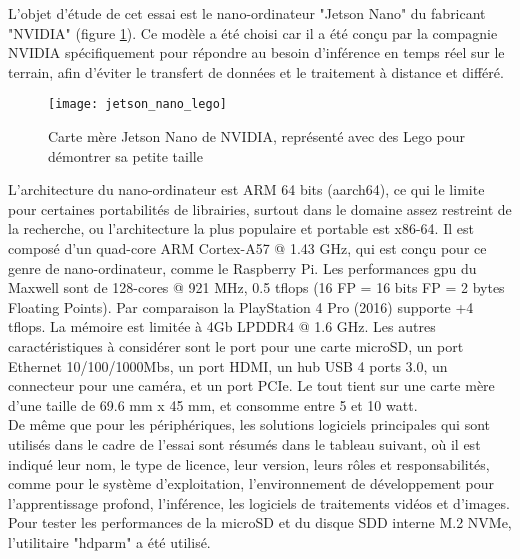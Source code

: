 ﻿
\noindent L'objet d'étude de cet essai est le nano-ordinateur "Jetson Nano" du fabricant "NVIDIA" (figure \ref{fig:jetson_nano_lego}). Ce modèle a été choisi car il a été conçu par la compagnie NVIDIA spécifiquement pour répondre au besoin d'inférence en temps réel sur le terrain, afin d'éviter le transfert de données et le traitement à distance et différé. 
\begin{figure}[H]
    \centering
    \texttt{[image: jetson\_nano\_lego]}
    \caption[Carte mère Jetson Nano de NVIDIA]{Carte mère Jetson Nano de NVIDIA, représenté avec des Lego pour démontrer sa petite taille}
    \label{fig:jetson_nano_lego}
\end{figure}
\noindent L'architecture du nano-ordinateur est ARM 64 bits (aarch64), ce qui le limite pour certaines portabilités de librairies, surtout dans le domaine assez restreint de la recherche, ou l'architecture la plus populaire et portable est x86-64. Il est composé d'un quad-core ARM Cortex-A57 @ 1.43 GHz, qui est conçu pour ce genre de nano-ordinateur, comme le Raspberry Pi. Les performances \acrshort{gpu} du Maxwell sont de 128-cores @ 921 MHz, 0.5 \acrshort{tflops} (16 FP = 16 bits FP = 2 bytes Floating Points). Par comparaison la PlayStation 4 Pro (2016) supporte +4 \acrshort{tflops}. La mémoire est limitée à 4Gb LPDDR4 @ 1.6 GHz. Les autres caractéristiques à considérer sont le port pour une carte microSD, un port Ethernet 10/100/1000Mbs, un port HDMI, un hub USB 4 ports 3.0, un connecteur pour une caméra, et un port PCIe. Le tout tient sur une carte mère d'une taille de 69.6 mm x 45 mm, et consomme entre 5 et 10 watt.
\vspace{0.5\baselineskip}
\\
\noindent De même que pour les périphériques, les solutions logiciels principales qui sont utilisés dans le cadre de l'essai sont résumés dans le tableau suivant, où il est indiqué leur nom, le type de licence, leur version, leurs rôles et responsabilités, comme pour le système d'exploitation, l'environnement de développement pour l'apprentissage profond, l'inférence, les logiciels de traitements vidéos et d'images. 
\vspace{0.5\baselineskip}
\\
\noindent Pour tester les performances de la microSD et du disque SDD interne M.2 NVMe, l'utilitaire "hdparm" a été utilisé. 
\vspace{0.5\baselineskip}
\\

